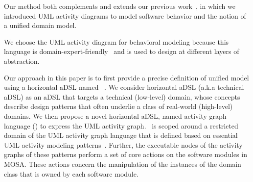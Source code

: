 %


Our method both complements and extends our previous work~\cite{le_domain_2018}, in which we introduced UML activity diagrams to model software behavior and the notion of a unified domain model.

We choose the UML activity diagram for behavioral modeling because this language is domain-expert-friendly~\cite{dumas_uml_2001} and is used to design at different layers of abstraction. 

Our approach in this paper is to first provide a precise definition of unified model using a horizontal aDSL named \dcsl~\cite{le_domain_2018}. We consider horizontal aDSL (a.k.a technical aDSL) as an aDSL that targets a technical (low-level) domain, whose concepts describe design patterns that often underlie a class of real-world (high-level) domains. 
%
We then propose a novel horizontal aDSL, named activity graph language (\agl) to express the UML activity graph. \agl~is scoped around a restricted domain of the UML activity graph language that is defined based on essential UML activity modeling patterns~\cite{omg_unified_2015}. 
Further, the executable nodes of the activity graphs of these patterns perform a set of core actions on the software modules in MOSA. These actions concern the manipulation of the instances of the domain class that is owned by each software module.

